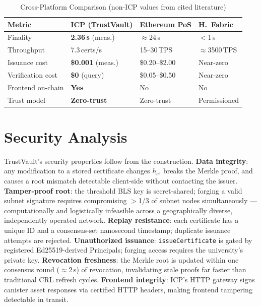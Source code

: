 \documentclass[conference]{IEEEtran}
\begin{document}
\begin{table}[t]
\caption{Cross-Platform Comparison (non-ICP values from cited literature)}
\label{tab:comparison}
\centering\small\renewcommand{\arraystretch}{1.2}
\setlength{\tabcolsep}{3pt}
\begin{tabular}{@{}llll@{}}
\toprule
\textbf{Metric} & \textbf{ICP (TrustVault)} & \textbf{Ethereum PoS} & \textbf{H.\ Fabric} \\
\midrule
Finality          & \textbf{2.36\,s} (meas.)  & $\approx$24\,s \cite{buterin2020eth2}  & $<$1\,s \cite{androulaki2018fabric} \\
Throughput        & 7.3\,certs/s              & 15--30\,TPS \cite{dinh2017blockbench}  & $\approx$3500\,TPS \cite{androulaki2018fabric} \\
Issuance cost     & \textbf{\$0.001} (meas.)  & \$0.20--\$2.00 \cite{wood2014ethereum} & Near-zero \\
Verification cost & \textbf{\$0} (query)      & \$0.05--\$0.50 \cite{wood2014ethereum} & Near-zero \\
Frontend on-chain & \textbf{Yes}              & No                                     & No \\
Trust model       & \textbf{Zero-trust}       & Zero-trust                             & Permissioned \\
\bottomrule
\end{tabular}
\end{table}

\section{Security Analysis}
\label{sec:security}

TrustVault's security properties follow from the construction. \textbf{Data integrity}: any modification to a stored certificate changes $h_c$, breaks the Merkle proof, and causes a root mismatch detectable client-side without contacting the issuer. \textbf{Tamper-proof root}: the threshold BLS key is secret-shared; forging a valid subnet signature requires compromising $>$1/3 of subnet nodes simultaneously — computationally and logistically infeasible across a geographically diverse, independently operated network. \textbf{Replay resistance}: each certificate has a unique ID and a consensus-set nanosecond timestamp; duplicate issuance attempts are rejected. \textbf{Unauthorized issuance}: \texttt{issueCertificate} is gated by registered Ed25519-derived Principals; forging access requires the university's private key. \textbf{Revocation freshness}: the Merkle root is updated within one consensus round ($\approx$2\,s) of revocation, invalidating stale proofs far faster than traditional CRL refresh cycles. \textbf{Frontend integrity}: ICP's HTTP gateway signs canister asset responses via certified HTTP headers, making frontend tampering detectable in transit.
\end{document}

